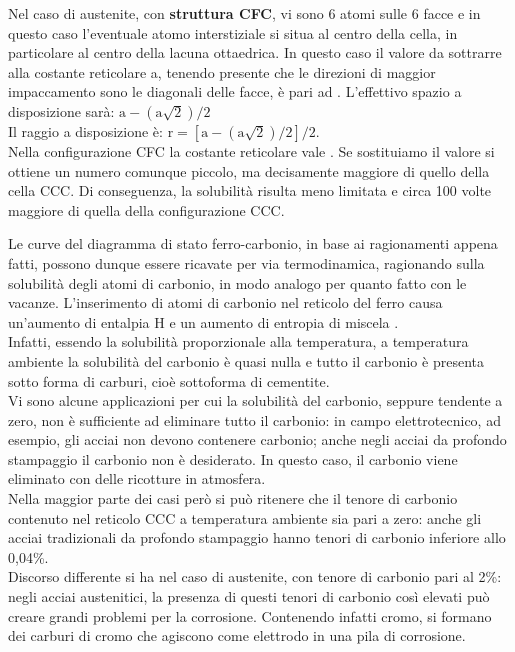 Nel caso di austenite, con \textbf{struttura CFC}, vi sono 6 atomi sulle 6 facce e in questo caso l’eventuale atomo interstiziale si situa al centro della cella, in particolare al centro della lacuna ottaedrica. In questo caso il valore da sottrarre alla costante reticolare a, tenendo presente che le direzioni di maggior impaccamento sono le diagonali delle facce, è pari ad . L’effettivo spazio a disposizione sarà: $\mathrm{a-(a\sqrt{2})/2}$\\
Il raggio a disposizione è: $\mathrm{r = [a-(a\sqrt{2})/2]/2}$.\\
Nella configurazione CFC la costante reticolare vale . Se sostituiamo il valore si ottiene un numero comunque piccolo, ma decisamente maggiore di quello della cella CCC. Di conseguenza, la solubilità risulta meno limitata e circa 100 volte maggiore di quella della configurazione CCC.

Le curve del diagramma di stato ferro-carbonio, in base ai ragionamenti appena fatti, possono dunque essere ricavate per via termodinamica, ragionando sulla solubilità degli atomi di carbonio, in modo analogo per quanto fatto con le vacanze. L’inserimento di atomi di carbonio nel reticolo del ferro causa un’aumento di entalpia H e un aumento di entropia di miscela .\\
Infatti, essendo la solubilità proporzionale alla temperatura, a temperatura ambiente la solubilità del carbonio è quasi nulla e tutto il carbonio è presenta sotto forma di carburi, cioè sottoforma di cementite.\\
Vi sono alcune applicazioni per cui la solubilità del carbonio, seppure tendente a zero, non è sufficiente ad eliminare tutto il carbonio: in campo elettrotecnico, ad esempio, gli acciai non devono contenere carbonio; anche negli acciai da profondo stampaggio il carbonio non è desiderato. In questo caso, il carbonio viene eliminato con delle ricotture in atmosfera.\\
Nella maggior parte dei casi però si può ritenere che il tenore di carbonio contenuto nel reticolo CCC a temperatura ambiente sia pari a zero: anche gli acciai tradizionali da profondo stampaggio hanno tenori di carbonio inferiore allo 0,04\%.\\
Discorso differente si ha nel caso di austenite, con tenore di carbonio pari al 2\%: negli acciai austenitici, la presenza di questi tenori di carbonio così elevati può creare grandi problemi per la corrosione. Contenendo infatti cromo, si formano dei carburi di cromo che agiscono come elettrodo in una pila di corrosione.\\

